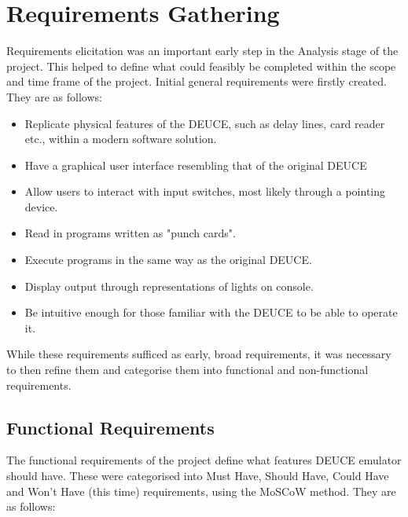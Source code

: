 \documentclass{l4proj}
\begin{document}
\section{Requirements Gathering}
Requirements elicitation was an important early step in the Analysis stage of the project. This helped to define what could feasibly be completed within the scope and time frame of the project. Initial general requirements were firstly created. They are as follows:
\begin{itemize}
	\item Replicate physical features of the DEUCE, such as delay lines, card reader etc., within a modern software solution.
	\item Have a graphical user interface resembling that of the original DEUCE
	\item Allow users to interact with input switches, most likely through a pointing device.
	\item Read in programs written as "punch cards".
	\item Execute programs in the same way as the original DEUCE.
	\item Display output through representations of lights on console.
	\item Be intuitive enough for those familiar with the DEUCE to be able to operate it.	
\end{itemize}
	
While these requirements sufficed as early, broad requirements, it was necessary to then refine them and categorise them into functional and non-functional requirements.

\subsection{Functional Requirements}
The functional requirements of the project define what features DEUCE emulator should have. These were categorised into Must Have, Should Have, Could Have and Won't Have (this time) requirements, using the MoSCoW method. They are as follows:
\\
 
\end{document}

